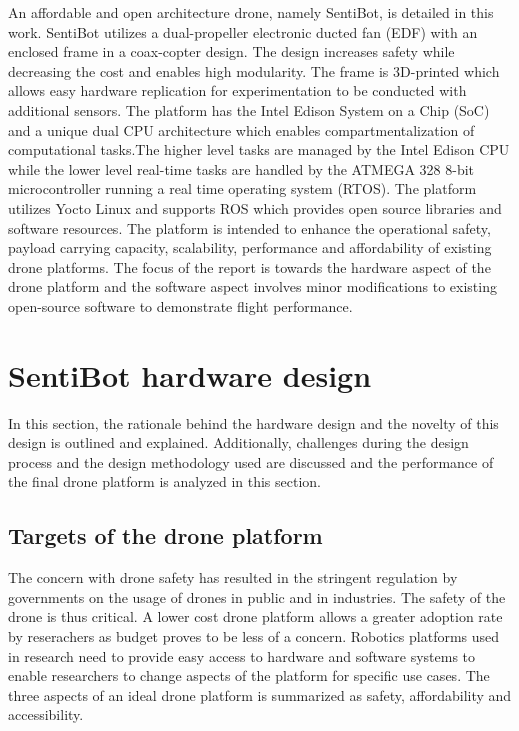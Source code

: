\documentclass[12pt]{article}
\begin{document}
An affordable and open architecture drone, namely SentiBot, is detailed in this work. SentiBot utilizes a dual-propeller electronic ducted fan (EDF) with an enclosed frame in a coax-copter design. The design increases safety while decreasing the cost and enables high modularity. The frame is 3D-printed which allows easy hardware replication for experimentation to be conducted with additional sensors. The platform has the Intel Edison System on a Chip (SoC) and a unique dual CPU architecture which enables compartmentalization of computational tasks.\cite{inteledison}The higher level tasks are managed by the Intel Edison CPU while the lower level real-time tasks are handled by the ATMEGA 328 8-bit microcontroller running a real time operating system (RTOS). The platform utilizes Yocto Linux and supports ROS which provides open source libraries and software resources\cite{ROS}. The platform is intended to enhance the operational safety, payload carrying capacity, scalability, performance and affordability of existing drone platforms. The focus of the report is towards the hardware aspect of the drone platform and the software aspect involves minor modifications to existing open-source software to demonstrate flight performance.

\section{SentiBot hardware design}

In this section, the rationale behind the hardware design and the novelty of this design is outlined and explained. Additionally, challenges during the design process and the design methodology used are discussed and the performance of the final drone platform is analyzed in this section.

\subsection{Targets of the drone platform}

The concern with drone safety has resulted in the stringent regulation by governments on the usage of drones in public and in industries. The safety of the drone is thus critical. A lower cost drone platform allows a greater adoption rate by reserachers as budget proves to be less of a concern.\cite{stateschoolfunding} Robotics platforms used in research need to provide easy access to hardware and software systems to enable researchers to change aspects of the platform for specific use cases\cite{materialrobotics}. The three aspects of an ideal drone platform is summarized as safety, affordability and accessibility. 
\end{document}
